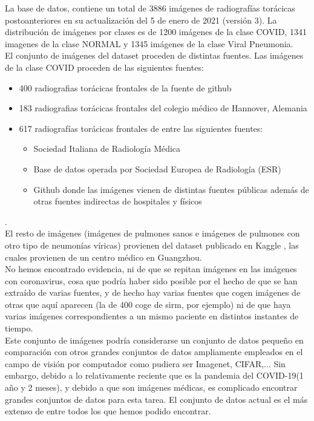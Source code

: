 \documentclass[11pt,a4paper]{article}
\theoremstyle{definition}
\begin{document}
La base de datos, contiene un total de 3886 imágenes de radiografías torácicas postoanteriores en su actualización del 5 de enero de 2021 (versión 3). La distribución de imágenes por clases es de 1200 imágenes de la clase COVID, 1341 imagenes de la clase NORMAL y 1345 imágenes de la clase Viral Pneumonia.\\

El conjunto de imágenes del dataset proceden de distintas fuentes. Las imágenes de la clase COVID proceden de las siguientes fuentes:
\begin{itemize}
\item 400 radiografias torácicas frontales de la fuente de github \cite{ref1}
\item 183  radiografias torácicas frontales del colegio médico de Hannover, Alemania \cite{ref2}
\item 617 radiografías torácicas frontales de entre las siguientes fuentes:
\begin{itemize}
\item Sociedad Italiana de Radiología Médica \cite{ref3}

\item Base de datos operada por Sociedad Europea de Radiología (ESR) \cite{ref4}

\item Github donde las imágenes vienen de distintas fuentes públicas además de otras fuentes indirectas de hospitales y físicos \cite{ref5}
\end{itemize}
\end{itemize}.\\

El resto de imágenes (imágenes de pulmones sanos e imágenes de pulmones con otro tipo de neumonías víricas) provienen del dataset publicado en Kaggle \cite{ref6}, las cuales provienen de un centro médico en Guangzhou.\\

No hemos encontrado evidencia,  ni de que se repitan imágenes en las imágenes con coronavirus,  cosa que podría haber sido posible por el hecho de que se han extraído de varias fuentes,  y de hecho hay varias fuentes que cogen imágenes de otras que aquí aparecen (la de 400 coge de sirm,  por ejemplo) ni de que haya varias imágenes correspondientes a un mismo paciente en distintos instantes de tiempo. \\

Este conjunto de imágenes podría considerarse un conjunto de datos pequeño en comparación con otros grandes conjuntos de datos ampliamente empleados en el campo de visión por computador como pudiera ser Imagenet, CIFAR,...  Sin embargo, debido a lo relativamente reciente que es la pandemia del COVID-19(1 año y 2 meses),  y debido a que son imágenes médicas, es complicado encontrar grandes conjuntos de datos para esta tarea. El conjunto de datos actual es el más extenso de entre todos los que hemos podido encontrar.
\end{document}
